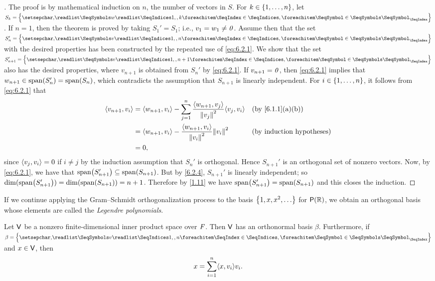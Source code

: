 \begin{proof}[]
  The proof is by mathematical induction on \(n\), the number of vectors in \(S\).
  For \(k \in \left\lbrace1, \dots, n\right\rbrace\), let \(S_k = \set{\seq{w}{1,,k}}\).
  If \(n = 1\), then the theorem is proved by taking \(S_1' = S_1\);
  i.e., \(v_1 = w_1 \neq \mathit{0}\).
  Assume then that the set \(S_n' = \set{\seq{v}{1,,n}}\) with the desired properties has been constructed by the repeated use of \cref{eq:6.2.1}.
  We show that the set \(S_{n + 1}' = \set{\seq{v}{1,,n+1}}\) also has the desired properties, where \(v_{n + 1}\) is obtained from \(S_n'\) by \cref{eq:6.2.1}.
  If \(v_{n + 1} = \mathit{0}\), then \cref{eq:6.2.1} implies that \(w_{n + 1} \in \spn{S_n'} = \spn{S_n}\), which contradicts the assumption that \(S_{n + 1}\) is linearly independent.
  For \(i \in \left\lbrace1, \dots, n\right\rbrace\), it follows from \cref{eq:6.2.1} that
  \begin{align*}
    \inn{v_{n + 1}, v_i} & = \inn{w_{n + 1}, v_i} - \sum_{j = 1}^n \frac{\inn{w_{n + 1}, v_j}}{\norm{v_j}^2} \inn{v_j, v_i} &  & \text{(by \cref{6.1.1}(a)(b))}   \\
                         & = \inn{w_{n + 1}, v_i} - \frac{\inn{w_{n + 1}, v_i}}{\norm{v_i}^2} \norm{v_i}^2                  &  & \text{(by induction hypotheses)} \\
                         & = 0,
  \end{align*}
  since \(\left\langle v_j, v_i\right\rangle = 0\) if \(i \neq j\) by the induction assumption that \(S_n'\) is orthogonal.
  Hence \(S_{n + 1}'\) is an orthogonal set of nonzero vectors.
  Now, by \cref{eq:6.2.1}, we have that \(\spn{S_{n + 1}'} \subseteq \spn{S_{n + 1}}\).
  But by \cref{6.2.4}, \(S_{n + 1}'\) is linearly independent;
  so \(\dim(\spn{S_{n + 1}'}) = \dim(\spn{S_{n + 1}}) = n + 1\).
  Therefore by \cref{1.11} we have \(\spn{S_{n + 1}'} = \spn{S_{n + 1}}\) and this closes the induction.
\end{proof}

\begin{defn}\label{6.2.5}
  If we continue applying the Gram--Schmidt orthogonalization process to the basis \(\set{1, x, x^2, \dots}\) for \(\ps{\R}\), we obtain an orthogonal basis whose elements are called the \emph{Legendre polynomials}.
\end{defn}

\begin{thm}\label{6.5}
  Let \(\mathsf{V}\) be a nonzero finite-dimensional inner product space over \(\mathit{F}\).
  Then \(\mathsf{V}\) has an orthonormal basis \(\beta\).
  Furthermore, if \(\beta = \set{\seq{v}{1,,n}}\) and \(x \in \mathsf{V}\), then
  \[
    x = \sum_{i = 1}^n \inn{x, v_i} v_i.
  \]
\end{thm}

